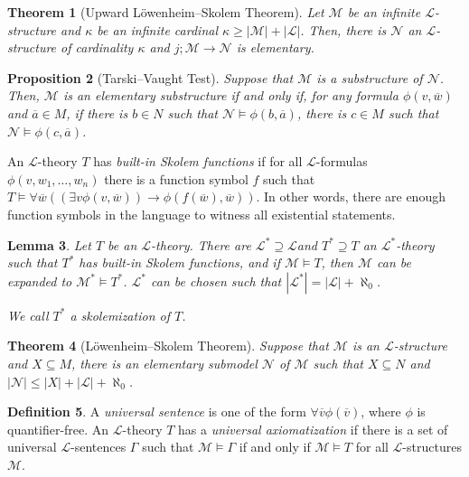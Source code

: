 \documentclass{amsart}
\newtheorem{theorem}{Theorem}[section]
\newtheorem{lemma}[theorem]{Lemma}
\newtheorem{proposition}[theorem]{Proposition}
\theoremstyle{definition}
\newtheorem{definition}[theorem]{Definition}
\numberwithin{equation}{section}
\begin{document}
\begin{theorem}[Upward L\"owenheim--Skolem Theorem]
    Let $\mathcal{M}$ be an infinite $\mathcal{L}$-structure and 
    $\kappa$ be an infinite cardinal $\kappa \ge |\mathcal{M}| + |\mathcal{L}|$.
    Then, there is $\mathcal{N}$ an $\mathcal{L}$-structure of cardinality $\kappa$ and $j; \mathcal{M} \to \mathcal{N}$ is elementary.
\end{theorem}

\begin{proposition}[Tarski--Vaught Test]
    Suppose that $\mathcal{M}$ is a substructure of $\mathcal{N}$.
    Then, $\mathcal{M}$ is an elementary substructure if and only if,
    for any formula $\phi(v,\overline{w})$ and $\overline{a} \in M$,
    if there is $b \in N$ such that $\mathcal{N} \models \phi(b,\overline{a})$,
    there is $c \in M$ such that $\mathcal{N} \models \phi(c,\overline{a})$.
\end{proposition}

An $\mathcal{L}$-theory $T$ has \emph{built-in Skolem functions}
if for all $\mathcal{L}$-formulas $\phi(v,w_1,\dots,w_n)$ there is a function symbol $f$ such that $T \models \forall \overline{w} ((\exists v \phi(v,\overline{w})) \to \phi(f(\overline{w}),\overline{w}))$.
In other words, there are enough function symbols in the language to witness all existential statements.

\begin{lemma}
    Let $T$ be an $\mathcal{L}$-theory. 
    There are $\mathcal{L}^* \supseteq \mathcal{L}$and $T^* \supseteq T$ an $\mathcal{L}^*$-theory such that $T^*$ has built-in Skolem functions, 
    and if $\mathcal{M} \models T$, 
    then $\mathcal{M}$ can be expanded to $\mathcal{M}^* \models T^*$. 
    $\mathcal{L}^*$ can be chosen such that $|\mathcal{L}^*|= |\mathcal{L}|+\aleph_0$.

    We call $T^*$ a skolemization of $T$.
\end{lemma}

\begin{theorem}[L\"owenheim--Skolem Theorem]
    Suppose that $\mathcal{M}$ is an $\mathcal{L}$-structure and 
    $X \subseteq M$, there is an elementary submodel $\mathcal{N}$ of $\mathcal{M}$ such that $X \subseteq N$ and $|\mathcal{N}| \le |X| + |\mathcal{L}| + \aleph_0$.
\end{theorem}

\begin{definition}
    A \emph{universal sentence} is one of the form 
    $\forall \overline{v} \phi(\overline{v})$,
    where $\phi$ is quantifier-free.
    An $\mathcal{L}$-theory $T$ has a \emph{universal axiomatization} if there is a set of universal $\mathcal{L}$-sentences $\Gamma$
    such that $\mathcal{M} \models \Gamma$ if and only if $\mathcal{M} \models T$ for all $\mathcal{L}$-structures $\mathcal{M}$.
\end{definition}
\end{document}
